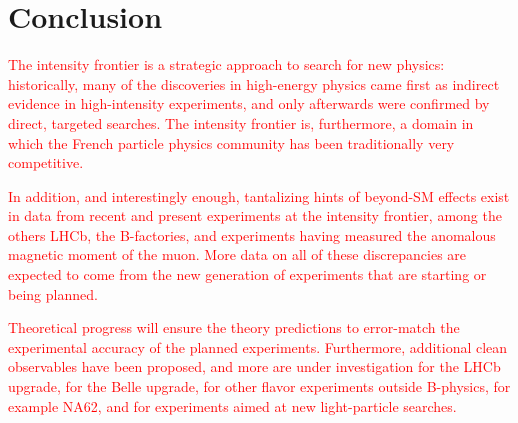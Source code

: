\section{Conclusion}


\textcolor{red}{The intensity frontier is a strategic approach to search for new physics: historically, many of the discoveries in high-energy physics came first as indirect evidence in high-intensity experiments, and only afterwards were confirmed by direct, targeted searches. The intensity frontier is, furthermore, a domain in which the French particle physics community has been traditionally very competitive.}

\textcolor{red}{In addition, and interestingly enough, tantalizing hints of beyond-SM effects exist in data from recent and present experiments at the intensity frontier, among the others LHCb, the B-factories, and experiments having measured the anomalous magnetic moment of the muon. More data on all of these discrepancies are expected to come from the new generation of experiments that are starting or being planned.}

\textcolor{red}{Theoretical progress will ensure the theory predictions to error-match the experimental accuracy of the planned experiments. Furthermore, additional clean observables have been proposed, and more are under investigation for the LHCb upgrade, for the Belle upgrade, for other flavor experiments outside B-physics, for example NA62, and for experiments aimed at new light-particle searches.}


